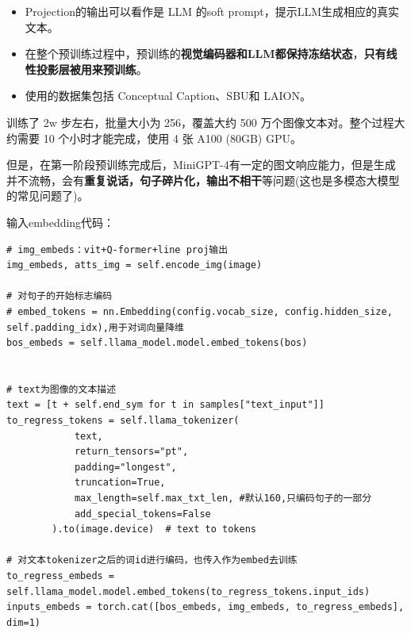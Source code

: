 \documentclass[zihao=false,fontset=windows]{ctexart}
\begin{document}
\begin{itemize}
\item Projection的输出可以看作是 LLM 的soft prompt，提示LLM生成相应的真实文本。\par
\item 在整个预训练过程中，预训练的\textbf{视觉编码器和LLM都保持冻结状态}，\textcolor{feishuRed}{\textbf{只有线性投影层被用来预训练}}。\par
\item 使用的数据集包括 Conceptual Caption、SBU和 LAION。\par
\end{itemize}

训练了 2w 步左右，批量大小为 256，覆盖大约 500 万个图像文本对。整个过程大约需要 10 个小时才能完成，使用 4 张 A100 (80GB) GPU。\par

但是，在第一阶段预训练完成后，MiniGPT-4有一定的图文响应能力，但是生成并不流畅，会有\textbf{重复说话，句子碎片化，输出不相干}等问题(这也是多模态大模型的常见问题了)。\par

输入embedding代码：\par

\begin{feishucode}
\begin{lstlisting}
# img_embeds：vit+Q-former+line proj输出
img_embeds, atts_img = self.encode_img(image) 

# 对句子的开始标志编码
# embed_tokens = nn.Embedding(config.vocab_size, config.hidden_size, self.padding_idx),用于对词向量降维
bos_embeds = self.llama_model.model.embed_tokens(bos)


# text为图像的文本描述
text = [t + self.end_sym for t in samples["text_input"]]
to_regress_tokens = self.llama_tokenizer(
            text,
            return_tensors="pt",
            padding="longest",
            truncation=True,
            max_length=self.max_txt_len, #默认160,只编码句子的一部分
            add_special_tokens=False
        ).to(image.device)  # text to tokens

# 对文本tokenizer之后的词id进行编码，也传入作为embed去训练
to_regress_embeds = self.llama_model.model.embed_tokens(to_regress_tokens.input_ids) 
inputs_embeds = torch.cat([bos_embeds, img_embeds, to_regress_embeds], dim=1)
\end{lstlisting}
\end{feishucode}
\end{document}
